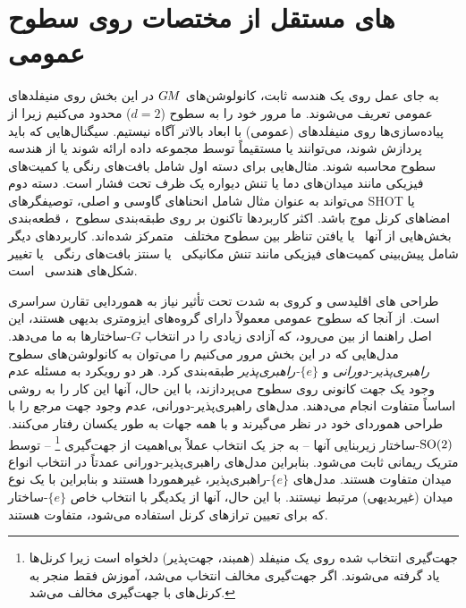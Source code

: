 

\section{های مستقل از مختصات روی سطوح عمومی}
\label{sec:instantiations_mesh}


به جای عمل روی یک هندسه ثابت، کانولوشن‌های $G\mkern-1.4muM$ در این بخش روی منیفلدهای عمومی تعریف می‌شوند.
ما مرور خود را به سطوح ($d=2$) محدود می‌کنیم زیرا از پیاده‌سازی‌ها روی منیفلدهای (عمومی) با ابعاد بالاتر آگاه نیستیم.
سیگنال‌هایی که باید پردازش شوند، می‌توانند یا مستقیماً توسط مجموعه داده ارائه شوند یا از هندسه سطوح محاسبه شوند.
مثال‌هایی برای دسته اول شامل بافت‌های رنگی یا کمیت‌های فیزیکی مانند میدان‌های دما یا تنش دیواره یک ظرف تحت فشار است.
دسته دوم می‌تواند به عنوان مثال شامل انحناهای گاوسی و اصلی، توصیفگرهای SHOT یا امضاهای کرنل موج باشد.
اکثر کاربردها تاکنون بر روی طبقه‌بندی سطوح~\cite{huang2019texturenet,jin2018learning,Wiersma2020}، قطعه‌بندی بخش‌هایی از آنها~\cite{poulenard2018multi,huang2019texturenet,Wiersma2020,Yang2020parallelFrameCNN} یا یافتن تناظر بین سطوح مختلف~\cite{masci2015geodesic,boscaini2016learning,schonsheck2018parallel,Wiersma2020,deHaan2020meshCNNs} متمرکز شده‌اند.
کاربردهای دیگر شامل پیش‌بینی کمیت‌های فیزیکی مانند تنش مکانیکی~\cite{sun2018zernet} یا سنتز بافت‌های رنگی~\cite{turk2001texture,ying2001texture} یا تغییر شکل‌های هندسی~\cite{hertz2020GeomTextureSynthesis} است.


طراحی های اقلیدسی و کروی به شدت تحت تأثیر نیاز به هموردایی تقارن سراسری است.
از آنجا که سطوح عمومی معمولاً دارای گروه‌های ایزومتری بدیهی هستند، این اصل راهنما از بین می‌رود، که آزادی زیادی را در انتخاب $G$-ساختارها به ما می‌دهد.
مدل‌هایی که در این بخش مرور می‌کنیم را می‌توان به کانولوشن‌های سطوح \emph{راهبری‌پذیر-دورانی} و \emph{$\{e\}$-راهبری‌پذیر} طبقه‌بندی کرد.
هر دو رویکرد به مسئله عدم وجود یک جهت کانونی روی سطوح می‌پردازند، با این حال، آنها این کار را به روشی اساساً متفاوت انجام می‌دهند.
مدل‌های راهبری‌پذیر-دورانی، عدم وجود جهت مرجع را با طراحی هموردای خود در نظر می‌گیرند و با همه جهات به طور یکسان رفتار می‌کنند.
$\operatorname{SO}(2)$-ساختار زیربنایی آنها -- به جز یک انتخاب عملاً بی‌اهمیت از جهت‌گیری%
\footnote{
	جهت‌گیری انتخاب شده روی یک منیفلد (همبند، جهت‌پذیر) دلخواه است زیرا کرنل‌ها یاد گرفته می‌شوند.
	اگر جهت‌گیری مخالف انتخاب می‌شد، آموزش فقط منجر به کرنل‌های با جهت‌گیری مخالف می‌شد.
}
-- توسط متریک ریمانی ثابت می‌شود.
بنابراین مدل‌های راهبری‌پذیر-دورانی عمدتاً در انتخاب انواع میدان متفاوت هستند.
مدل‌های $\{e\}$-راهبری‌پذیر، غیرهموردا هستند و بنابراین با یک نوع میدان (غیربدیهی) مرتبط نیستند.
با این حال، آنها از یکدیگر با انتخاب خاص $\{e\}$-ساختار که برای تعیین ترازهای کرنل استفاده می‌شود، متفاوت هستند.


